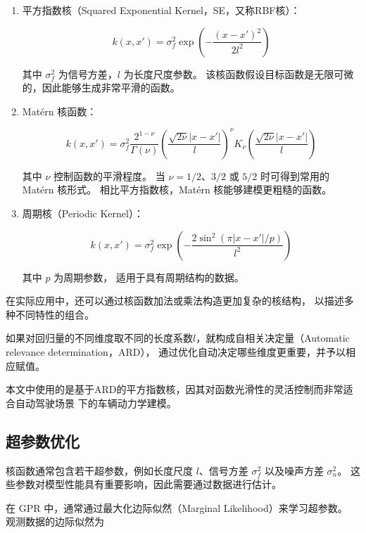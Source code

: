 \begin{enumerate}
    \item 平方指数核（Squared Exponential Kernel，SE，又称RBF核）：

\begin{equation}
    k(x,x') =
    \sigma_f^2
    \exp
    \left(
    -\frac{(x-x')^2}{2l^2}
    \right)
\end{equation}

其中 $\sigma_f^2$ 为信号方差，$l$ 为长度尺度参数。
该核函数假设目标函数是无限可微的，因此能够生成非常平滑的函数。

    \item Matérn 核函数：

\begin{equation}
k(x,x') =
\sigma_f^2
\frac{2^{1-\nu}}{\Gamma(\nu)}
\left(
\frac{\sqrt{2\nu}|x-x'|}{l}
\right)^\nu
K_\nu
\left(
\frac{\sqrt{2\nu}|x-x'|}{l}
\right)
\end{equation}

其中 $\nu$ 控制函数的平滑程度。
当 $\nu=1/2$、$3/2$ 或 $5/2$ 时可得到常用的 Matérn 核形式。
相比平方指数核，Matérn 核能够建模更粗糙的函数。

    \item 周期核（Periodic Kernel）：

\begin{equation}
k(x,x') =
\sigma_f^2
\exp
\left(
-\frac{2\sin^2(\pi |x-x'| / p)}{l^2}
\right)
\end{equation}

其中 $p$ 为周期参数，
适用于具有周期结构的数据。
\end{enumerate}

在实际应用中，还可以通过核函数加法或乘法构造更加复杂的核结构，
以描述多种不同特性的组合。

如果对回归量的不同维度取不同的长度系数$l$，就构成自相关决定量（Automatic relevance determination，ARD），
通过优化自动决定哪些维度更重要，并予以相应赋值。

本文中使用的是基于ARD的平方指数核，因其对函数光滑性的灵活控制而非常适合自动驾驶场景
下的车辆动力学建模。

\subsection{超参数优化}

核函数通常包含若干超参数，例如长度尺度 $l$、信号方差 $\sigma_f^2$
以及噪声方差 $\sigma_n^2$。
这些参数对模型性能具有重要影响，因此需要通过数据进行估计。

在 GPR 中，通常通过最大化边际似然（Marginal Likelihood）来学习超参数。
观测数据的边际似然为

